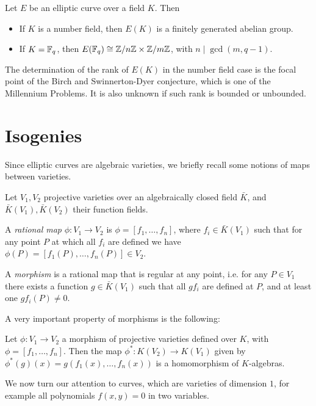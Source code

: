 \begin{theorem}
    Let $E$ be an elliptic curve over a field $K$. Then
    \begin{itemize}
        \item If $K$ is a number field, then $E(K)$ is a finitely generated abelian group.
        \item If $K=\mathbb{F}_q$, then $E(\mathbb{F}_q)\cong\mathbb{Z}/n\mathbb{Z}\times\mathbb{Z}/m\mathbb{Z}$, with $n\mid\gcd(m, q-1)$.
    \end{itemize}
\end{theorem}

The determination of the rank of $E(K)$ in the number field case is the focal point of the Birch and Swinnerton-Dyer conjecture, which is one of the Millennium Problems. It is also unknown if such rank is bounded or unbounded.

\section{Isogenies}

Since elliptic curves are algebraic varieties, we briefly recall some notions of maps between varieties.

\begin{definition}
    Let $V_1,V_2$ projective varieties over an algebraically closed field $\bar K$, and $\bar K(V_1), \bar K(V_2)$ their function fields.
    
    A \emph{rational map} $\phi:V_1\to V_2$ is $\phi=[f_1,\dots,f_n]$, where $f_i\in\bar K(V_1)$ such that for any point $P$ at which all $f_i$ are defined we have $\phi(P)=[f_1(P),\dots,f_n(P)]\in V_2$.
    
    A \emph{morphism} is a rational map that is regular at any point, i.e. for any $P\in V_1$ there exists a function $g\in\bar K(V_1)$ such that all $gf_i$ are defined at $P$, and at least one $gf_i(P)\neq0$.
\end{definition}

A very important property of morphisms is the following:
\begin{proposition}
    Let $\phi: V_1\to V_2$ a morphism of projective varieties defined over $K$, with $\phi=[f_1,\dots,f_n]$. Then the map $\phi^\ast:K(V_2)\to K(V_1)$ given by $\phi^\ast(g)(x)=g(f_1(x),\dots,f_n(x))$ is a homomorphism of $K$-algebras.
\end{proposition}

We now turn our attention to curves, which are varieties of dimension $1$, for example all polynomials $f(x,y)=0$ in two variables.

